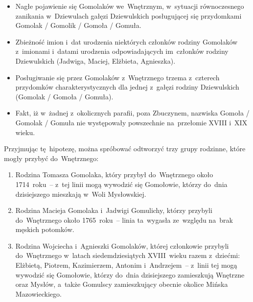 \begin{itemize}
    \item Nagłe pojawienie się Gomolaków we~Wnętrznym, w~sytuacji 
    równoczesnego zanikania w~Dziewulach gałęzi Dziewulskich posługującej się 
    przydomkami Gomolak / Gomolik / Gomoła / Gomuła.
    \item Zbieżność imion i~dat urodzenia niektórych członków rodziny
    Gomolaków z~imionami i~datami urodzenia odpowiadających im~członków
    rodziny Dziewulskich (Jadwiga, Maciej, Elżbieta, Agnieszka).
    \item Posługiwanie się przez Gomolaków z~Wnętrznego trzema z~czterech 
    przydomków charakterystycznych dla jednej z~gałęzi rodziny Dziewulskich
    (Gomolak / Gomoła / Gomuła).
    \item Fakt, iż w~żadnej z~okolicznych parafii, poza Zbuczynem, nazwiska 
    Gomoła / Gomolak / Gomuła nie występowały powszechnie na~przełomie XVIII
    i~XIX wieku.
\end{itemize}
 
Przyjmując tę~hipotezę, można spróbować odtworzyć trzy grupy rodzinne, które
mogły przybyć do~Wnętrznego:

\begin{enumerate}
    \item Rodzina Tomasza
    Gomolaka, który przybył
    do~Wnętrznego około 1714~roku~-- z~tej linii mogą wywodzić się Gomołowie,
    którzy do~dnia dzisiejszego mieszkają w~Woli Mysłowskiej.
    \item Rodzina Macieja Gomolaka
    i~Jadwigi Gomulichy,
    którzy przybyli do~Wnętrznego około 1765~roku~-- linia ta~wygasła
    ze~względu na~brak męskich potomków.
    \item Rodzina Wojciecha
    i~Agnieszki Gomolaków,
    której członkowie przybyli do~Wnętrznego w~latach siedemdziesiątych
    XVIII~wieku razem z~dziećmi:
    Elżbietą,
    Piotrem,
    Kazimierzem,
    Antonim
    i~Andrzejem~-- z~linii tej
    mogą wywodzić się Gomołowie, którzy do~dnia dzisiejszego zamieszkują
    Wnętrzne oraz Mysłów, a~także Gomulscy zamieszkujący obecnie okolice
    Mińska Mazowieckiego.
\end{enumerate}

